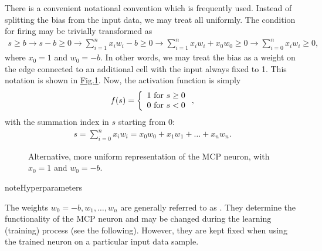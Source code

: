 \documentclass[letterpaper,10pt,english]{jupyterBook}
\let\sphinxpxdimen\pdfpxdimen\else\newdimen\sphinxpxdimen
\begin{document}
\sphinxAtStartPar
There is a convenient notational convention which is frequently used. Instead of splitting the bias from the input data, we may treat all uniformly. The condition for firing may be trivially transformed as
\begin{equation*}
\begin{split}
s \ge b  \to s-b \ge 0 \to \sum_{i=1}^n x_i w_i - b \ge 0 \to \sum_{i=1}^n x_i w_i +x_0 w_0 \ge 0 
\to \sum_{i=0}^n x_i w_i \ge 0,
\end{split}
\end{equation*}
\sphinxAtStartPar
where \(x_0=1\) and \(w_0=-b\). In other words, we may treat the bias as a weight on the edge connected to an additional cell with the input always fixed to 1. This notation is shown in \hyperref[\detokenize{docs/mcp:mcp2-fig}]{Fig.\@ \ref{\detokenize{docs/mcp:mcp2-fig}}}. Now, the activation function is simply
\begin{equation}\label{equation:docs/mcp:eq-f}
\begin{split}f(s) = \left \{ \begin{array}{l} 1 {\rm ~for~} s \ge 0 \\ 0 {\rm ~for~} s < 0 \end{array} \right .,\end{split}
\end{equation}
\sphinxAtStartPar
with the summation index in \(s\) starting from \(0\):
\begin{equation}\label{equation:docs/mcp:eq-f0}
\begin{split}s=\sum_{i=0}^n x_i w_i = x_0 w_0+x_1 w_1 + \dots + x_n w_n.\end{split}
\end{equation}
\begin{figure}[htbp]
\centering
\capstart

\noindent\sphinxincludegraphics[width=320\sphinxpxdimen]{{mcp-2a}.png}
\caption{Alternative, more uniform representation of the MCP neuron, with \(x_0=1\) and \(w_0=-b\).}\label{\detokenize{docs/mcp:mcp2-fig}}\end{figure}

\begin{sphinxadmonition}{note}{Hyperparameters}

\sphinxAtStartPar
The weights \(w_0=-b,w_1,\dots,w_n\) are generally referred to as . They determine the functionality of the MCP neuron and may be changed during the learning (training) process (see the following). However, they are kept fixed when using the trained neuron on a particular input data sample.
\end{sphinxadmonition}
\end{document}
